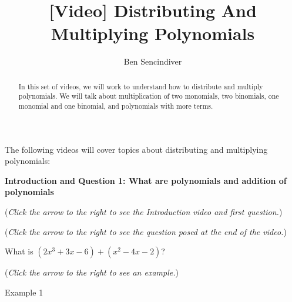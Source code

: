 \documentclass{ximera}
\title[Prerequisite Videos: ]{[Video] Distributing And Multiplying Polynomials}
\author{Ben Sencindiver}
\begin{document}
\begin{abstract}
  In this set of videos, we will work to understand how to distribute and 
  multiply polynomials. We will talk about multiplication of two monomials, 
  two binomials, one monomial and one binomial, and polynomials with more terms. 
\end{abstract}
\maketitle

The following videos will cover topics about distributing and multiplying polynomials:

\textbf{Introduction and Question 1: What are polynomials and addition of polynomials}
\begin{question}
\begin{flushright}
{\color{blue}(\emph{Click the arrow to the right to see the Introduction video and first question.})}
\end{flushright}
\begin{center}
\begin{expandable}
{\color{blue}(\emph{Click the arrow to the right to see the question
posed at the end of the video.})}
\begin{expandable}
What is $(2x^3 + 3x - 6) + (x^2 -4x -2)$?
\begin{multipleChoice}
\end{multipleChoice}
\begin{flushright}
{\color{blue}(\emph{Click the arrow to the right to see an example.})}
\end{flushright}
\begin{expandable}
Example 1
\end{expandable}
\end{expandable}
\end{expandable}
\end{center}
\end{question}
\end{document}
